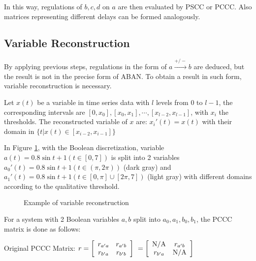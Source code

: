 In this way, regulations of $b,c,d$ on $a$ are then evaluated by PSCC or PCCC.
Also matrices representing different delays can be formed analogously.

\subsection{Variable Reconstruction}
By applying previous steps, regulations in the form of $a\xrightarrow{+/-}b$ are deduced, but the result is not in the precise form of ABAN. To obtain a result in such form, variable reconstruction is necessary.

\begin{definition}
    Let $x(t)$ be a variable in time series data with $l$ levels from $0$ to $l-1$, the corresponding intervals are $[0,x_0],[x_0,x_1],\cdots,[x_{l-2},x_{l-1}]$, with $x_i$ the thresholds. 
    The reconstructed variable of $x$ are:
        $x_i'(t)=x(t)$ with their domain in $\{t|x(t)\in [x_{i-2},x_{i-1}]\}$
\end{definition}

\begin{example}
In Figure \ref{varRec}, with the Boolean discretization, variable $a(t)=0.8\sin t+1(t\in [0,7])$ is split into 2 variables $a_0'(t)=0.8\sin t+1(t\in (\pi,2\pi))$ (dark gray) and $a_1'(t)=0.8\sin t+1(t\in [0,\pi]\cup[2\pi,7])$ (light gray) with different domains according to the qualitative threshold.
\end{example}

\begin{figure}[ht]

\caption[Variable reconstruction]{Example of variable reconstruction}\label{varRec}
\end{figure}


For a system with 2 Boolean variables $a,b$ split into $a_0,a_1,b_0,b_1$, the PCCC matrix is done as follows:


Original PCCC Matrix: $r=\left[
\begin{array}{*{20}c}
r_{a'a} & r_{a'b}\\
r_{b'a} & r_{b'b} \\
\end{array}
\right]\ =\left[
\begin{array}{*{20}c}
{\rm N/A} & r_{a'b}\\
r_{b'a} & {\rm N/A} \\
\end{array}
\right]\ 
$

